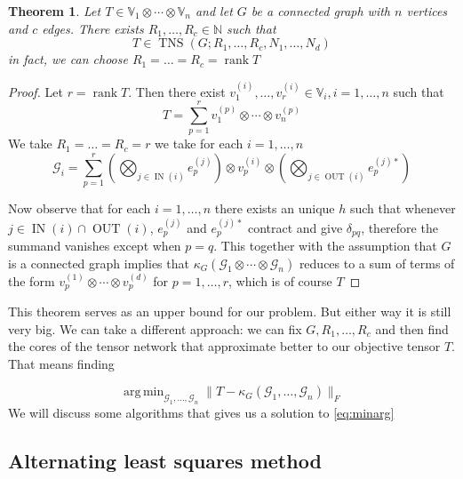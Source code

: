 \documentclass[11pt,a4paper,openright,oneside]{book}
\numberwithin{equation}{section}
\newtheorem{thm0}[defn0]{Theorem}
\newenvironment{theorem}{\bigskip \begin{thm0}}{\end{thm0}}
\newcommand{\refeq}[1]{\cref{#1}}
\DeclareMathOperator{\rank}{rank}
\DeclareMathOperator{\IN}{IN}
\DeclareMathOperator{\OUT}{OUT}
\DeclareMathOperator{\TNS}{TNS}
\DeclareMathOperator*{\argmin}{arg\,min}
\begin{document}
\begin{theorem}  Let $T \in \mathbb{V}_1 \otimes \cdots \otimes \mathbb{V}_n$ and let $G$ be a connected graph with $n$ vertices and $c$ edges.
    There exists $R_1, \dots, R_c \in \mathbb{N}$ such that
    $$T \in \TNS(G; R_1, \dots, R_c, N_1, \dots, N_d)$$
    in fact, we can choose $R_1 = \dots = R_c = \rank{T}$
\end{theorem}

\begin{proof} Let $r = \rank{T}$. Then there exist $v_1^{(i)}, \dots, v_r^{(i)} \in \mathbb{V}_i, i = 1, \dots, n$ such that
    $$T = \sum_{p=1}^r v_1^{(p)} \otimes \cdots \otimes v_n^{(p)}$$
    We take $R_1 = \dots = R_c = r$ we take for each $i = 1, \dots, n$
    $$\mathcal{G}_i = \sum_{p=1}^r \left( \bigotimes\nolimits_{j \in \IN(i)} e_p^{(j)} \right) \otimes v_p^{(i)} \otimes 
    \left( \bigotimes\nolimits_{j \in \OUT(i)} e_p^{(j)*} \right)$$

    Now observe that for each $i = 1, \dots, n$ there exists an unique $h$ such that whenever $j \in \IN(i)\cap \OUT(i)$,
    $e_p^{(j)}$ and $e_p^{(j)*}$ contract and give $\delta_{pq}$, therefore the summand vanishes except when $p = q$.
    This together with the assumption that $G$ is a connected graph implies that $\kappa_G(\mathcal{G}_1 \otimes \cdots \otimes \mathcal{G}_n)$ reduces
    to a sum of terms of the form $v_p^{(1)} \otimes \cdots \otimes v_p^{(d)}$ for $p = 1, \dots, r$, which is of course $T$
\end{proof}

This theorem serves as an upper bound for our problem. But either way it is still very big. We can take a different approach:
we can fix $G, R_1, \dots, R_c$ and then find the cores of the tensor network that approximate better to our
objective tensor $T$. That means finding

\begin{equation}
\argmin_{\mathcal{G}_1, \dots, \mathcal{G}_n} \|T - \kappa_G (\mathcal{G}_1, \dots, \mathcal{G}_n) \|_F
\label{eq:minarg}
\end{equation}
We will discuss some algorithms that gives us a solution to \refeq{eq:minarg}

\subsection{Alternating least squares method}
\end{document}
